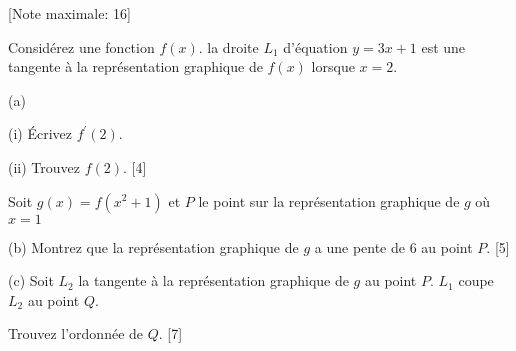 \begin{question}
  \hspace*{\fill} [Note maximale: 16]\par

  \noindent Considérez une fonction $f(x)$. la droite $L_1$ d’équation $y = 3x + 1$ est une tangente à la représentation graphique de $f(x)$ lorsque $x = 2$.\par
  \medskip
  (a)\par
  \hspace{2em} (i)  Écrivez $f^\prime(2)$.\par
  \medskip
  \hspace{2em} (ii) Trouvez $f(2)$.\hspace*{\fill} [4]\par
  \medskip
  \noindent Soit $g(x) = f(x^2 + 1)$ et $P$ le point sur la représentation graphique de $g$ où $x = 1$\par
  \medskip
  (b) Montrez que la représentation graphique de $g$ a une pente de 6 au point $P$.\hspace*{\fill} [5]\par
  \medskip
  (c) Soit $L_2$ la tangente à la représentation graphique de $g$ au point $P$. $L_1$ coupe $L_2$ au point $Q$.\par
  \hspace{1em} Trouvez l’ordonnée de $Q$.\hspace*{\fill} [7]\par
\end{question}

